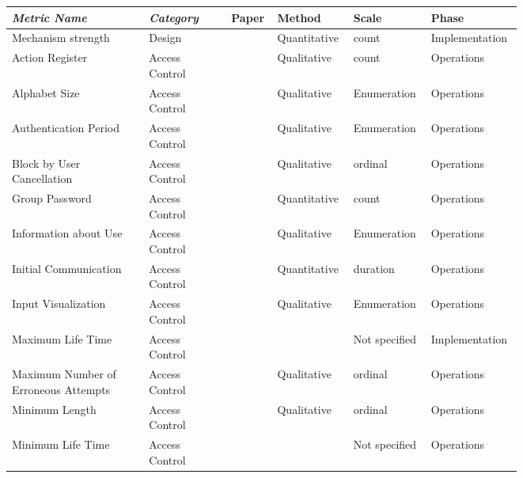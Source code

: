 \begin{tiny}
 \begin{longtable}{@{}p{0.25\linewidth}p{0.15\linewidth}p{0.05\linewidth}p{0.1\linewidth}p{0.1\linewidth}p{0.1\linewidth}@{}}
\cmidrule(r){1-6}
\textit{\textbf{Metric Name}} & \textit{\textbf{Category}} & \textbf{Paper} & \textbf{Method} & \textbf{Scale} & \textbf{Phase} \\* \cmidrule(r){1-6}
\endhead
%
Mechanism strength & Design  & \cite{Liu_Man_2005} & Quantitative & count & Implementation \\
Action Register & Access Control  & \cite{Villarrubia_Fernandez-Medina_Piattini_2006} & Qualitative & count & Operations \\
Alphabet Size & Access Control  & \cite{Villarrubia_Fernandez-Medina_Piattini_2006} & Qualitative & Enumeration & Operations \\
Authentication Period & Access Control  & \cite{Villarrubia_Fernandez-Medina_Piattini_2006} & Qualitative & Enumeration & Operations \\
Block by User Cancellation & Access Control  & \cite{Villarrubia_Fernandez-Medina_Piattini_2006} & Qualitative & ordinal & Operations \\
Group Password & Access Control  & \cite{Villarrubia_Fernandez-Medina_Piattini_2006} & Quantitative & count & Operations \\
Information about Use & Access Control  & \cite{Villarrubia_Fernandez-Medina_Piattini_2006} & Qualitative & Enumeration & Operations \\
Initial Communication & Access Control  & \cite{Villarrubia_Fernandez-Medina_Piattini_2006} & Quantitative & duration & Operations \\
Input Visualization & Access Control  & \cite{Villarrubia_Fernandez-Medina_Piattini_2006} & Qualitative & Enumeration & Operations \\
Maximum Life Time & Access Control  & \cite{Villarrubia_Fernandez-Medina_Piattini_2006} &  & Not specified & Implementation \\
Maximum Number of Erroneous Attempts & Access Control  & \cite{Villarrubia_Fernandez-Medina_Piattini_2006} & Qualitative & ordinal & Operations \\
Minimum Length & Access Control  & \cite{Villarrubia_Fernandez-Medina_Piattini_2006} & Qualitative & ordinal & Operations \\
Minimum Life Time & Access Control  & \cite{Villarrubia_Fernandez-Medina_Piattini_2006} &  & Not specified & Operations \\

\end{longtable}
\end{tiny}
